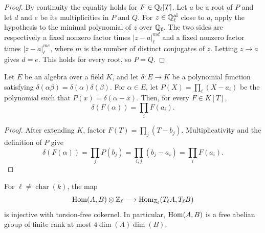 \begin{proof}
By continuity the equality holds for $F\in\mathbb{Q}_\ell[T]$.  Let $a$ be a root
of $P$ and let $d$ and $e$ be its multiplicities in $P$ and $Q$.  For
$z\in\mathbb{Q}_\ell^{\rm al}$ close to $a$, apply the hypothesis to the minimal
polynomial of $z$ over $\mathbb{Q}_\ell$.  The two sides are respectively a fixed
nonzero factor times $|z-a|_\ell^{md}$ and a fixed nonzero factor times
$|z-a|_\ell^{me}$, where $m$ is the number of distinct conjugates of $z$.
Letting $z\to a$ gives $d=e$.  This holds for every root, so $P=Q$.
\end{proof}

\begin{lemma}
\label{lem:milne-multiplicative-polynomial}

Let $E$ be an algebra over a field $K$, and let $\delta:E\to K$ be a
polynomial function satisfying $\delta(\alpha\beta)=\delta(\alpha)\delta(\beta)$.
For $\alpha\in E$, let $P(X)=\prod_i(X-a_i)$ be the polynomial such that
$P(x)=\delta(\alpha-x)$.  Then, for every $F\in K[T]$,
\[
\delta(F(\alpha))=\prod_iF(a_i).
\]
\end{lemma}

\begin{proof}
After extending $K$, factor $F(T)=\prod_j(T-b_j)$.  Multiplicativity and
the definition of $P$ give
\[
\delta(F(\alpha))=\prod_jP(b_j)=\prod_{i,j}(b_j-a_i)
 =\prod_iF(a_i).
\]
\end{proof}

\begin{theorem}
\label{thm:milne-hom-tate-injective}

For $\ell\ne\operatorname{char}(k)$, the map
\[
 \operatorname{Hom}(A,B)\otimes\mathbb{Z}_\ell\longrightarrow
 \operatorname{Hom}_{\mathbb{Z}_\ell}(T_\ell A,T_\ell B)
\]
is injective with torsion-free cokernel.  In particular,
$\operatorname{Hom}(A,B)$ is a free abelian group of finite rank at most
$4\dim(A)\dim(B)$.
\end{theorem}

